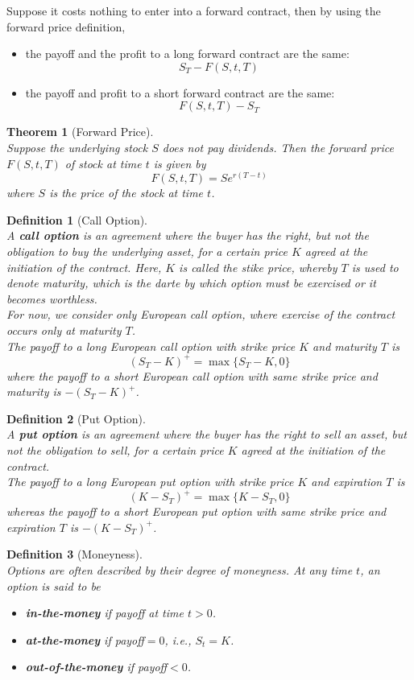 \documentclass[12pt]{article}
\newtheorem{definition}{Definition}[section]
\newtheorem{theorem}{Theorem}[section]
\theoremstyle{definition}
\begin{document}
Suppose it costs nothing to enter into a forward contract, then by using the forward price definition, 
\begin{itemize}
  \item the payoff and the profit to a long forward contract are the same:
  \[
S_T-F(S, t, T)
  \]
  \item the payoff and profit to a short forward contract are the same:
  \[
F(S,t,T) - S_T
  \]
\end{itemize}
\begin{theorem}[Forward Price]
\hfill\\\normalfont Suppose the underlying stock $S$ does not pay dividends. Then the forward price $F(S,t, T)$ of stock at time $t$ is given by
\[
F(S,t,T) = Se^{r(T-t)}
\]
where $S$ is the price of the stock at time $t$.
\end{theorem}
\begin{definition}[Call Option]
\hfill\\\normalfont A \textbf{call option} is an agreement where the buyer has the \textit{right}, but not the obligation to buy the underlying asset, for a certain price $K$ agreed at the initiation of the contract. Here, $K$ is called the stike price, whereby $T$ is used to denote maturity, which is the darte by which option must be exercised or it becomes worthless. \\
For now, we consider only European call option, where exercise of the contract occurs only at maturity $T$.\\
The payoff to a long European call option with strike price $K$ and maturity $T$ is
\[
(S_T-K)^+=\max\{S_T-K,0\}
\]
where the payoff to a short European call option with same strike price and maturity is $-(S_T-K)^+$.
\end{definition}
\begin{definition}[Put Option]
\hfill\\\normalfont A \textbf{put option} is an agreement where the buyer has the right to sell an asset, but not the obligation to sell, for a certain price $K$ agreed at the initiation of the contract.\\
The payoff to a long European put option with strike price $K$ and expiration $T$ is
\[
(K-S_T)^+=\max\{K-S_T,0\}
\]
whereas the payoff to a short European put option with same strike price and expiration $T$ is $-(K-S_T)^+$.
\end{definition}
\begin{definition}[Moneyness]
\hfill\\\normalfont Options are often described by their degree of moneyness. At any time $t$, an option is said to be 
\begin{itemize}
  \item \textbf{in-the-money} if payoff at time $t>0$.
  \item \textbf{at-the-money} if payoff$=0$, i.e., $S_t=K$.
  \item \textbf{out-of-the-money} if payoff$<0$.
\end{itemize}
\end{definition}
\end{document}

